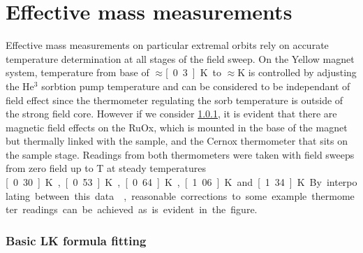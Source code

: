 
\section{Effective mass measurements}


Effective mass measurements on particular extremal orbits rely on accurate temperature determination at all stages of the field sweep. On the Yellow magnet system, temperature from base of $\approx$\unit[0.3]{K} to $\approx$\unit[2]{K} is controlled by adjusting the He$^3$ sorbtion pump temperature and can be considered to be independant of field effect since the thermometer regulating the sorb temperature is outside of the strong field core. However if we consider \fig\ref{}, it is evident that there are magnetic field effects on the RuOx, which is mounted in the base of the magnet but thermally linked with the sample, and the Cernox thermometer that sits on the sample stage. Readings from both thermometers were taken with field sweeps from zero field up to \unit[18]{T} at steady temperatures \unit[0.30]{K}, \unit[0.53]{K}, \unit[0.64]{K}, \unit[1.06]{K} and \unit[1.34]{K}. By interpolating between this data, reasonable corrections to some example thermometer readings can be achieved as is evident in the figure.

\subsubsection{Basic LK formula fitting}

